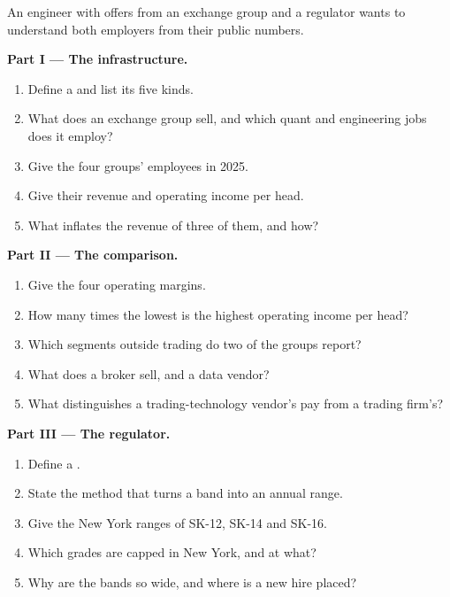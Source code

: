 \begin{problem}\label{pb:in:exchanges-brokers-vendors-and-regulators-as-employers:1}
An engineer with offers from an exchange group and a regulator wants to understand both employers from their public
numbers.

\medskip\noindent\textbf{Part I --- The infrastructure.}
\begin{enumerate}
\item Define a  and list its five kinds.
\item What does an exchange group sell, and which quant and engineering jobs does it employ?
\item Give the four groups' employees in 2025.
\item Give their revenue and operating income per head.
\item What inflates the revenue of three of them, and how?
\end{enumerate}

\medskip\noindent\textbf{Part II --- The comparison.}
\begin{enumerate}[resume]
\item Give the four operating margins.
\item How many times the lowest is the highest operating income per head?
\item Which segments outside trading do two of the groups report?
\item What does a broker sell, and a data vendor?
\item What distinguishes a trading-technology vendor's pay from a trading firm's?
\end{enumerate}

\medskip\noindent\textbf{Part III --- The regulator.}
\begin{enumerate}[resume]
\item Define a .
\item State the method that turns a band into an annual range.
\item Give the New York ranges of SK-12, SK-14 and SK-16.
\item Which grades are capped in New York, and at what?
\item Why are the bands so wide, and where is a new hire placed?
\end{enumerate}


\end{problem}
